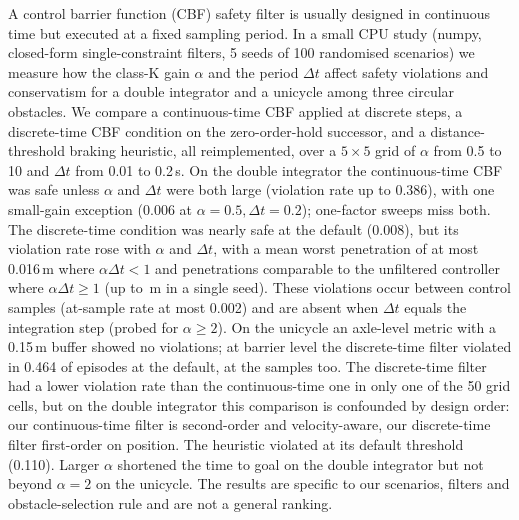 A control barrier function (CBF) safety filter is usually designed in continuous time but executed at a fixed sampling period. In a small CPU study (numpy, closed-form single-constraint filters, 5 seeds of 100 randomised scenarios) we measure how the class-K gain $\alpha$ and the period $\Delta t$ affect safety violations and conservatism for a double integrator and a unicycle among three circular obstacles. We compare a continuous-time CBF applied at discrete steps, a discrete-time CBF condition on the zero-order-hold successor, and a distance-threshold braking heuristic, all reimplemented, over a $5\times5$ grid of $\alpha$ from 0.5 to 10 and $\Delta t$ from 0.01 to 0.2\,s. On the double integrator the continuous-time CBF was safe unless $\alpha$ and $\Delta t$ were both large (violation rate up to 0.386), with one small-gain exception (0.006 at $\alpha=0.5,\Delta t=0.2$); one-factor sweeps miss both. The discrete-time condition was nearly safe at the default (0.008), but its violation rate rose with $\alpha$ and $\Delta t$, with a mean worst penetration of at most 0.016\,m where $\alpha\Delta t<1$ and penetrations comparable to the unfiltered controller where $\alpha\Delta t\ge1$ (up to \,m in a single seed). These violations occur between control samples (at-sample rate at most 0.002) and are absent when $\Delta t$ equals the integration step (probed for $\alpha\ge2$). On the unicycle an axle-level metric with a 0.15\,m buffer showed no violations; at barrier level the discrete-time filter violated in 0.464 of episodes at the default, at the samples too. The discrete-time filter had a lower violation rate than the continuous-time one in only one of the 50 grid cells, but on the double integrator this comparison is confounded by design order: our continuous-time filter is second-order and velocity-aware, our discrete-time filter first-order on position. The heuristic violated at its default threshold (0.110). Larger $\alpha$ shortened the time to goal on the double integrator but not beyond $\alpha=2$ on the unicycle. The results are specific to our scenarios, filters and obstacle-selection rule and are not a general ranking.
